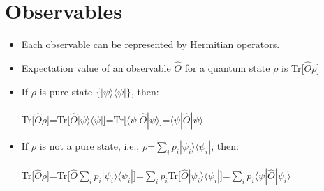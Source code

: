 \documentclass{article}
\begin{document}
\section{Observables}
\begin{itemize}
	\item Each observable can be represented by Hermitian operators.
\end{itemize}
\begin{itemize}
	\item Expectation value of an observable ${\hat{O}}$ for a quantum state $\rho$  is Tr[${\hat{O}\rho}$]
\end{itemize}
\begin{itemize}
	\item If $\rho$ is pure state {$\{|\psi\rangle\langle\psi|\}$}, then:\\\\
	      Tr[${\hat{O}\rho}$]=Tr[${\hat{O}|\psi\rangle\langle\psi|}$]=Tr[${\langle\psi|\hat{O}|\psi\rangle}$]=${\langle\psi|\hat{O}|\psi\rangle}$
\end{itemize}
\begin{itemize}
	\item If $\rho$ is not a pure state, i.e., $\rho$=$\sum\limits_{i}p_{i}|\psi_{i}\rangle\langle\psi_{i}|$, then:\\\\
	      Tr[${\hat{O}\rho}$]=Tr[${\hat{O}\sum\limits_{i}p_{i}|\psi_{i}\rangle\langle\psi_{i}|}$]=$\sum\limits_{i}p_{i}$Tr[${\hat{O}|\psi_{i}\rangle\langle\psi_{i}|}$]=$\sum\limits_{i}p_{i}\langle\psi|\hat{O}|\psi_{i}\rangle$
	      
\end{itemize}
\end{document}
